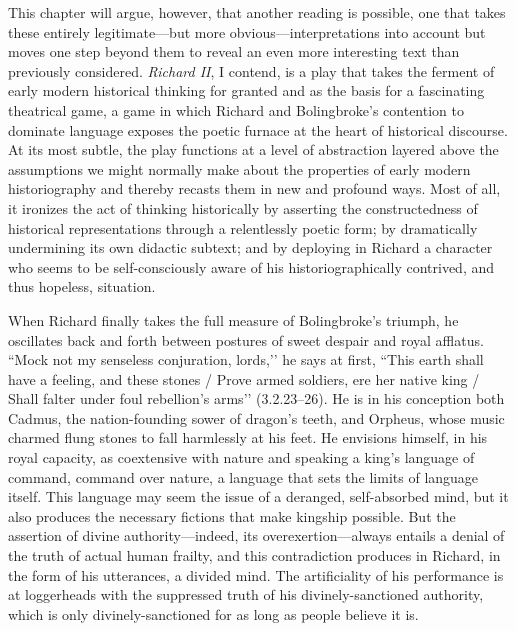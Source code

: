 This chapter will argue, however, that another reading is possible, one that takes these entirely legitimate---but more obvious---interpretations into account but moves one step beyond them to reveal an even more interesting text than previously considered.
\emph{Richard II}, I contend, is a play that takes the ferment of early modern historical thinking for granted and as the basis for a fascinating theatrical game, a game in which Richard and Bolingbroke’s contention to dominate language exposes the poetic furnace at the heart of historical discourse.
At its most subtle, the play functions at a level of abstraction layered above the assumptions we might normally make about the properties of early modern historiography and thereby recasts them in new and profound ways.
Most of all, it ironizes the act of thinking historically by asserting the constructedness of historical representations through a relentlessly poetic form; by dramatically undermining its own didactic subtext; and by deploying in Richard a character who seems to be self-consciously aware of his historiographically contrived, and thus hopeless, situation.

When Richard finally takes the full measure of Bolingbroke’s triumph, he oscillates back and forth between postures of sweet despair and royal afflatus.
``Mock not my senseless conjuration, lords,’’ he says at first, ``This earth shall have a feeling, and these stones / Prove armed soldiers, ere her native king / Shall falter under foul rebellion’s arms’’ (3.2.23--26).
He is in his conception both Cadmus, the nation-founding sower of dragon’s teeth, and Orpheus, whose music charmed flung stones to fall harmlessly at his feet.
He envisions himself, in his royal capacity, as coextensive with nature and speaking a king’s language of command, command over nature, a language that sets the limits of language itself.
This language may seem the issue of a deranged, self-absorbed mind, but it also produces the necessary fictions that make kingship possible.
But the assertion of divine authority---indeed, its overexertion---always entails a denial of the truth of actual human frailty, and this contradiction produces in Richard, in the form of his utterances, a divided mind.
The artificiality of his performance is at loggerheads with the suppressed truth of his divinely-sanctioned authority, which is only divinely-sanctioned for as long as people believe it is.

